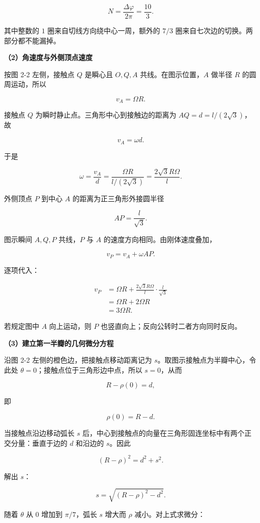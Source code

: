 \documentclass[12pt,a4paper,UTF8]{ctexart}
\begin{document}
\[\boxed{N=\frac{\Delta\varphi}{2\pi}=\frac{10}{3}}.\]

其中整数的 \(1\) 圈来自切线方向绕中心一周，额外的 \(7/3\)
圈来自七次边的切换。两部分都不能漏掉。

\textbf{（2）角速度与外侧顶点速度}

按图 2-2 左侧，接触点 \(Q\) 是瞬心且 \(O,Q,A\) 共线。在图示位置，\(A\)
做半径 \(R\) 的圆周运动，所以

\[v_A=\Omega R.\]

接触点 \(Q\) 为瞬时静止点。三角形中心到接触边的距离为
\(AQ=d=l/(2\sqrt3)\)，故

\[v_A=\omega d.\]

于是

\[\omega=\frac{v_A}{d}
=\frac{\Omega R}{l/(2\sqrt3)}
=\boxed{\frac{2\sqrt3R\Omega}{l}}.\]

外侧顶点 \(P\) 到中心 \(A\) 的距离为正三角形外接圆半径

\[AP=\frac{l}{\sqrt3}.\]

图示瞬间 \(A,Q,P\) 共线，\(P\) 与 \(A\) 的速度方向相同。由刚体速度叠加，

\[v_P=v_A+\omega AP.\]

逐项代入：

\[\begin{aligned}
v_P
&=\Omega R+\frac{2\sqrt3R\Omega}{l}\cdot\frac{l}{\sqrt3}\\
&=\Omega R+2\Omega R\\
&=\boxed{3\Omega R}.
\end{aligned}\]

若规定图中 \(A\) 向上运动，则 \(P\)
也竖直向上；反向公转时二者方向同时反向。

\textbf{（3）建立第一半瓣的几何微分方程}

沿图 2-2 左侧的橙色边，把接触点移动距离记为
\(s\)。取图示接触点为半瓣中心，令此处
\(\theta=0\)；接触点位于三角形边中点，所以 \(s=0\)，从而

\[R-\rho(0)=d,\]

即

\[\rho(0)=R-d.\]

当接触点沿边移动弧长 \(s\)
后，中心到接触点的向量在三角形固连坐标中有两个正交分量：垂直于边的 \(d\)
和沿边的 \(s\)。因此

\[(R-\rho)^2=d^2+s^2.\]

解出 \(s\)：

\[s=\sqrt{(R-\rho)^2-d^2}.\]

随着 \(\theta\) 从 \(0\) 增加到 \(\pi/7\)，弧长 \(s\) 增大而 \(\rho\)
减小。对上式求微分：
\end{document}
